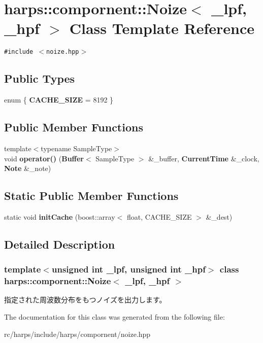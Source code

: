 \section{harps::compornent::Noize$<$ \_\-lpf, \_\-hpf $>$ Class Template Reference}
\label{classharps_1_1compornent_1_1Noize}
{\tt \#include $<$noize.hpp$>$}

\subsection*{Public Types}
\begin{CompactItemize}
\item 
enum \{ \textbf{CACHE\_\-SIZE} =  8192
 \}
\end{CompactItemize}
\subsection*{Public Member Functions}
\begin{CompactItemize}
\item 
{\footnotesize template$<$typename SampleType$>$ }\\void \textbf{operator()} ({\bf Buffer}$<$ SampleType $>$ \&\_\-buffer, {\bf CurrentTime} \&\_\-clock, {\bf Note} \&\_\-note)\label{classharps_1_1compornent_1_1Noize_2e28864237d665c259a1e411dd5d7082}

\end{CompactItemize}
\subsection*{Static Public Member Functions}
\begin{CompactItemize}
\item 
static void \textbf{initCache} (boost::array$<$ float, CACHE\_\-SIZE $>$ \&\_\-dest)\label{classharps_1_1compornent_1_1Noize_d833603ed1b8e5fec60aa27d8b585160}

\end{CompactItemize}


\subsection{Detailed Description}
\subsubsection*{template$<$unsigned int \_\-lpf, unsigned int \_\-hpf$>$ class harps::compornent::Noize$<$ \_\-lpf, \_\-hpf $>$}

指定された周波数分布をもつノイズを出力します。 

The documentation for this class was generated from the following file:\begin{CompactItemize}
\item 
rc/harps/include/harps/compornent/noize.hpp\end{CompactItemize}
